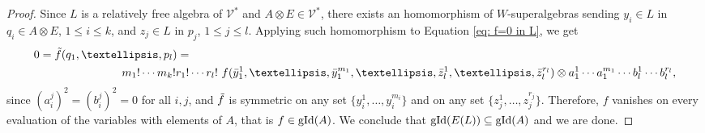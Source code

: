 \documentclass[10pt,a4paper]{amsart}
\DeclareMathOperator{\gid}{\textnormal{gId}}
\newcommand{\cV}{\mathcal{V}}
\begin{document}
\begin{proof}
    Since $L$ is a relatively free algebra of $\cV^*$ and $A\otimes E\in \cV^*$, there exists an homomorphism of $W$-superalgebras sending $y_i\in L$ in $q_i\in A\otimes E$, $1 \le i \le k$, and $z_j\in L$ in $p_j$, $1 \le j \le l$. Applying such homomorphism to Equation \ref{eq: f=0 in L}, we get
    \begin{align*}
    0=\Tilde{f}(q_1,\ldots,p_l)=&\\
    m_1!\cdots m_k!r_1!&\cdots r_l!\ f(\Bar{y}_1^1,\ldots,\Bar{y}_1^{m_1},\ldots,\Bar{z}_l^1,\ldots,\Bar{z}_l^{r_l}) \otimes a_1^1\cdots a_1^{m_1}\cdots b_l^1 \cdots b_l^{r_l},
 \end{align*}
 since $(a_i^j)^2=(b_i^j)^2=0$ for all $i,j$, and $\Tilde{f}$ is symmetric on any set $\{ y_i^1,\ldots,y_i^{m_i} \}$ and on any set $\{ z_j^1,\ldots,z_j^{r_j} \}$.
 Therefore, $f$ vanishes on every evaluation of the variables with elements of $A$, that is $f\in \gid(A)$. We conclude that $\gid(E(L))\subseteq \gid(A)$ and we are done.
\end{proof}
\end{document}
